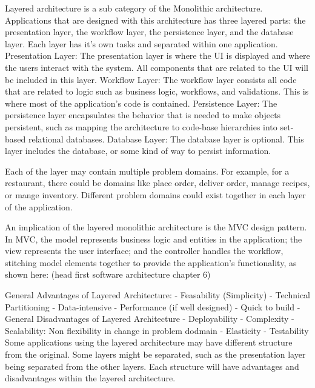 Layered architecture is a sub category of the Monolithic architecture. Applications that are designed with this architecture has three layered parts: 
the presentation layer, the workflow layer, the persistence layer, and the database layer. Each layer has it’s own tasks and separated within one application. 
Presentation Layer:
	The presentation layer is where the UI is displayed and where the users interact with the system.
   All components that are related to the UI will be included in this layer.
Workflow Layer:
	The workflow layer consists all code that are related to logic such as business logic, workflows, and validations. This is where most of the application’s code is contained.
Persistence Layer:
	The persistence layer encapsulates the behavior that is needed to make objects persistent, 
  such as mapping the architecture to code-base hierarchies into set-based relational databases.
Database Layer:
	The database layer is optional. This layer includes the database, or some kind of way to persist information.

Each of the layer may contain multiple problem domains. For example, for a restaurant, there could be domains like place order, 
deliver order, manage recipes, or mange inventory. Different problem domains could exist together in each layer of  the application. 

An implication of the layered monolithic architecture is the MVC design pattern.
In MVC, the model represents business logic and entities in the application; the view represents the user interface; 
and the controller handles the workflow, stitching model elements together to provide the application’s functionality, as shown here: (head first software architecture chapter 6)

General Advantages of Layered Architecture:
-	Feasability (Simplicity)
-	Technical Partitioning
-	Data-intensive
-	Performance (if well designed)
-	Quick to build
-	
General Disadvantages of Layered Architecture
-	Deployability
-	Complexity
-	Scalability: Non flexibility in change in problem dodmain
-	Elasticity
-	Testability
Some applications using the layered architecture may have different structure from the original. Some layers might be separated, 
such as the presentation layer being separated from the other layers. Each structure will have advantages and disadvantages within the layered architecture.

